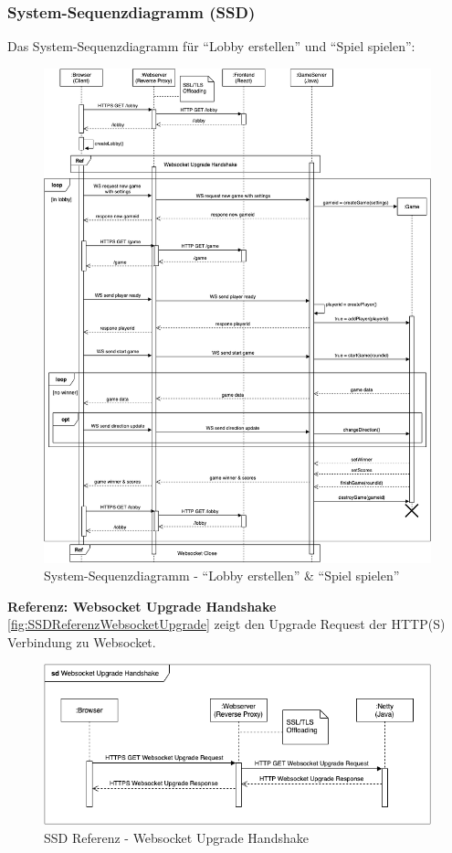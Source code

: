 \documentclass[11pt,ngerman]{article}
\newcommand{\quotes}[1]{``#1''}
\begin{document}
    \newpage
    \subsubsection{System-Sequenzdiagramm (SSD)}
    Das System-Sequenzdiagramm für \quotes{Lobby erstellen} und \quotes{Spiel spielen}:
    \begin{figure}[H]
    	\includegraphics[scale=0.5]{figures/SystemSequenceDiagram.png}
    	\caption{System-Sequenzdiagramm - \quotes{Lobby erstellen} \&  \quotes{Spiel spielen}}
    \end{figure}
    \newpage
    \noindent \textbf{Referenz: \Gls{Websocket} Upgrade Handshake} \\
    \autoref{fig:SSDReferenzWebsocketUpgrade} zeigt den Upgrade Request der HTTP(S) Verbindung  zu \Gls{Websocket}.
    \begin{figure}[H]
    	\centering
    	\includegraphics[scale=0.6]{figures/SSD-Websocket_Upgrade_Handshake.png}
    	\caption{SSD Referenz - \Gls{Websocket} Upgrade Handshake}
    	\label{fig:SSDReferenzWebsocketUpgrade}
    \end{figure}
\end{document}
